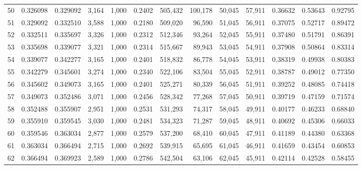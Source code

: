 \begin{tabular}{rrrrrrrrrrrrr}
50  &  0.326098 &  0.329092 &   3,164 &  1,000 &                                     0.2402 &  505,432 &  100,178 &   50,045 &   57,911 &  0.36632 &  0.53643 &  0.92795 \\
51  &  0.329092 &  0.332510 &   3,588 &  1,000 &                                     0.2180 &  509,020 &   96,590 &   51,045 &   56,911 &  0.37075 &  0.52717 &  0.89472 \\
52  &  0.332511 &  0.335697 &   3,326 &  1,000 &                                     0.2312 &  512,346 &   93,264 &   52,045 &   55,911 &  0.37480 &  0.51791 &  0.86391 \\
53  &  0.335698 &  0.339077 &   3,321 &  1,000 &                                     0.2314 &  515,667 &   89,943 &   53,045 &   54,911 &  0.37908 &  0.50864 &  0.83314 \\
54  &  0.339077 &  0.342277 &   3,165 &  1,000 &                                     0.2401 &  518,832 &   86,778 &   54,045 &   53,911 &  0.38319 &  0.49938 &  0.80383 \\
55  &  0.342279 &  0.345601 &   3,274 &  1,000 &                                     0.2340 &  522,106 &   83,504 &   55,045 &   52,911 &  0.38787 &  0.49012 &  0.77350 \\
56  &  0.345602 &  0.349073 &   3,165 &  1,000 &                                     0.2401 &  525,271 &   80,339 &   56,045 &   51,911 &  0.39252 &  0.48085 &  0.74418 \\
57  &  0.349073 &  0.352486 &   3,071 &  1,000 &                                     0.2456 &  528,342 &   77,268 &   57,045 &   50,911 &  0.39719 &  0.47159 &  0.71574 \\
58  &  0.352488 &  0.355907 &   2,951 &  1,000 &                                     0.2531 &  531,293 &   74,317 &   58,045 &   49,911 &  0.40177 &  0.46233 &  0.68840 \\
59  &  0.355910 &  0.359545 &   3,030 &  1,000 &                                     0.2481 &  534,323 &   71,287 &   59,045 &   48,911 &  0.40692 &  0.45306 &  0.66033 \\
60  &  0.359546 &  0.363034 &   2,877 &  1,000 &                                     0.2579 &  537,200 &   68,410 &   60,045 &   47,911 &  0.41189 &  0.44380 &  0.63368 \\
61  &  0.363034 &  0.366494 &   2,715 &  1,000 &                                     0.2692 &  539,915 &   65,695 &   61,045 &   46,911 &  0.41659 &  0.43454 &  0.60853 \\
62  &  0.366494 &  0.369923 &   2,589 &  1,000 &                                     0.2786 &  542,504 &   63,106 &   62,045 &   45,911 &  0.42114 &  0.42528 &  0.58455 \\

\end{tabular}
